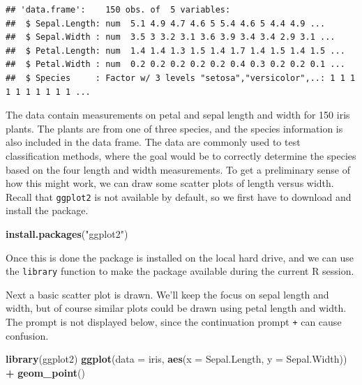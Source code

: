 \documentclass[
]{krantz}
\newenvironment{Shaded}{\begin{snugshade}}{\end{snugshade}}
\newcommand{\DataTypeTok}[1]{\textcolor[rgb]{0.13,0.29,0.53}{#1}}
\newcommand{\KeywordTok}[1]{\textcolor[rgb]{0.13,0.29,0.53}{\textbf{#1}}}
\newcommand{\NormalTok}[1]{#1}
\newcommand{\OperatorTok}[1]{\textcolor[rgb]{0.81,0.36,0.00}{\textbf{#1}}}
\newcommand{\StringTok}[1]{\textcolor[rgb]{0.31,0.60,0.02}{#1}}
\begin{document}
\begin{verbatim}
## 'data.frame':    150 obs. of  5 variables:
##  $ Sepal.Length: num  5.1 4.9 4.7 4.6 5 5.4 4.6 5 4.4 4.9 ...
##  $ Sepal.Width : num  3.5 3 3.2 3.1 3.6 3.9 3.4 3.4 2.9 3.1 ...
##  $ Petal.Length: num  1.4 1.4 1.3 1.5 1.4 1.7 1.4 1.5 1.4 1.5 ...
##  $ Petal.Width : num  0.2 0.2 0.2 0.2 0.2 0.4 0.3 0.2 0.2 0.1 ...
##  $ Species     : Factor w/ 3 levels "setosa","versicolor",..: 1 1 1 1 1 1 1 1 1 1 ...
\end{verbatim}

The data contain measurements on petal and sepal length and width for 150 iris plants. The plants are from one of three species, and the species information is also included in the data frame. The data are commonly used to test classification methods, where the goal would be to correctly determine the species based on the four length and width measurements. To get a preliminary sense of how this might work, we can draw some scatter plots of length versus width. Recall that \texttt{ggplot2} is not available by default, so we first have to download and install the package.

\begin{Shaded}
\begin{Highlighting}[]
\KeywordTok{install.packages}\NormalTok{(}\StringTok{"ggplot2"}\NormalTok{)}
\end{Highlighting}
\end{Shaded}

Once this is done the package is installed on the local hard drive, and we can use the \texttt{library} function to make the package available during the current R session.

Next a basic scatter plot is drawn. We'll keep the focus on sepal length and width, but of course similar plots could be drawn using petal length and width. The prompt is not displayed below, since the continuation prompt \texttt{+} can cause confusion.

\begin{Shaded}
\begin{Highlighting}[]
\KeywordTok{library}\NormalTok{(ggplot2)}
\KeywordTok{ggplot}\NormalTok{(}\DataTypeTok{data =}\NormalTok{ iris, }\KeywordTok{aes}\NormalTok{(}\DataTypeTok{x =}\NormalTok{ Sepal.Length, }\DataTypeTok{y =}\NormalTok{ Sepal.Width)) }\OperatorTok{+}\StringTok{ }
\StringTok{    }\KeywordTok{geom\_point}\NormalTok{()}
\end{Highlighting}
\end{Shaded}
\end{document}
